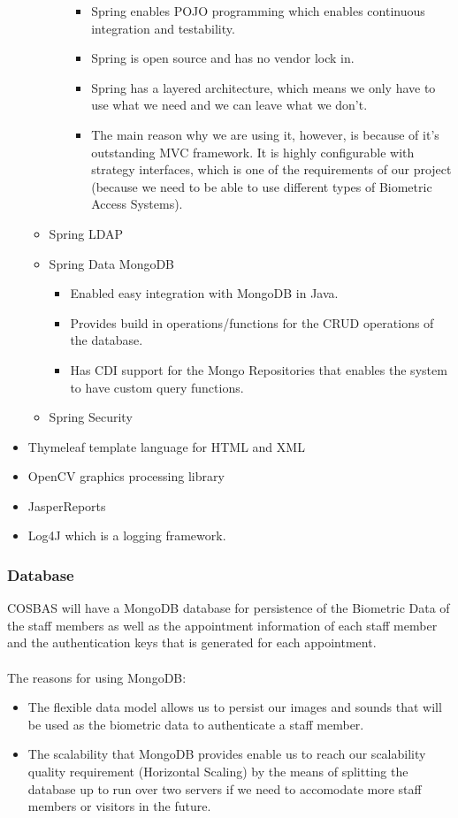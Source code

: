 \begin{itemize}
\begin{itemize}
\begin{itemize}
\begin{itemize}
						\item Spring enables POJO programming which enables continuous integration and testability.
						\item Spring is open source and has no vendor lock in.
						\item Spring has a layered architecture, which means we only have to use what we need and we can leave what we don't.
						\item The main reason why we are using it, however, is because of it's outstanding MVC framework. It is highly configurable with strategy interfaces, which is one of the requirements of our project (because we need to be able to use different types of Biometric Access Systems).
					\end{itemize}
					
				\end{itemize}
			\item Spring LDAP
			\item Spring Data MongoDB
				\begin{itemize}
					\item Enabled easy integration with MongoDB in Java.
					\item Provides build in operations/functions for the CRUD operations of the database.
					\item Has CDI support for the Mongo Repositories that enables the system to have custom query functions.
				\end{itemize}
			\item Spring Security
		\end{itemize}
	\item Thymeleaf template language for HTML and XML
	\item OpenCV graphics processing library
	\item JasperReports
	\item Log4J which is a logging framework.
\end{itemize}

\subsubsection{Database}
COSBAS will have a MongoDB database for persistence of the Biometric Data of the staff members as well as the appointment information of each staff member and the authentication keys that is generated for each appointment. \\
\\
The reasons for using MongoDB:
	\begin{itemize}
		\item The flexible data model allows us to persist our images and sounds that will be used as the biometric data to authenticate a staff member.
		\item The scalability that MongoDB provides enable us to reach our scalability quality requirement (Horizontal Scaling) by the means of splitting the database up to run over two servers if we need to accomodate more staff members or visitors in the future.
	\end{itemize}

